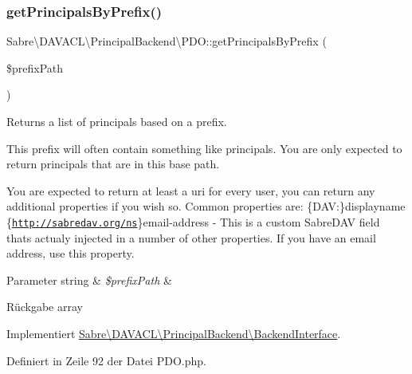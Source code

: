 \subsubsection{\texorpdfstring{get\+Principals\+By\+Prefix()}{getPrincipalsByPrefix()}}
{\footnotesize\ttfamily Sabre\textbackslash{}\+D\+A\+V\+A\+C\+L\textbackslash{}\+Principal\+Backend\textbackslash{}\+P\+D\+O\+::get\+Principals\+By\+Prefix (\begin{DoxyParamCaption}\item[{}]{\$prefix\+Path }\end{DoxyParamCaption})}

Returns a list of principals based on a prefix.

This prefix will often contain something like \textquotesingle{}principals\textquotesingle{}. You are only expected to return principals that are in this base path.

You are expected to return at least a \textquotesingle{}uri\textquotesingle{} for every user, you can return any additional properties if you wish so. Common properties are\+: \{D\+AV\+:\}displayname \{\href{http://sabredav.org/ns}{\tt http\+://sabredav.\+org/ns}\}email-\/address -\/ This is a custom Sabre\+D\+AV field that\textquotesingle{}s actualy injected in a number of other properties. If you have an email address, use this property.


\begin{DoxyParams}[1]{Parameter}
string & {\em \$prefix\+Path} & \\
\hline
\end{DoxyParams}
\begin{DoxyReturn}{Rückgabe}
array 
\end{DoxyReturn}


Implementiert \mbox{\hyperlink{interface_sabre_1_1_d_a_v_a_c_l_1_1_principal_backend_1_1_backend_interface_a8f5e0aa27706302146b96b9d09bbe195}{Sabre\textbackslash{}\+D\+A\+V\+A\+C\+L\textbackslash{}\+Principal\+Backend\textbackslash{}\+Backend\+Interface}}.



Definiert in Zeile 92 der Datei P\+D\+O.\+php.

\mbox{\label{class_sabre_1_1_d_a_v_a_c_l_1_1_principal_backend_1_1_p_d_o_ae26c3e73c6581e3b285fe9079febda27}} 
